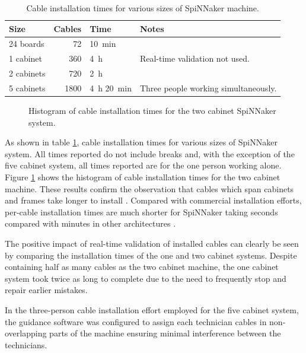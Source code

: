 			\begin{table}
				\center
				\begin{tabular}{lrll}
					\toprule
						Size & Cables & Time & Notes \\
					\midrule
						24 boards  & \num{72}   & \SI{10}{\minute} & \\
						1 cabinet  & \num{360}  & \SI{4}{\hour} &
							Real-time validation not used. \\
						2 cabinets & \num{720}  & \SI{2}{\hour} & \\
						5 cabinets & \num{1800} & \SI{4}{\hour} \SI{20}{\minute} &
							Three people working simultaneously. \\
					\bottomrule
				\end{tabular}
				
				\caption{Cable installation times for various sizes of SpiNNaker
				machine.}
				\label{tab:install-time}
			\end{table}
			
			\begin{figure}
				
				\caption{Histogram of cable installation times for the two cabinet
				SpiNNaker system.}
				\label{fig:install-histogram}
			\end{figure}
			
			As shown in table \ref{tab:install-time}, cable installation times for
			various sizes of SpiNNaker system. All times reported do not include
			breaks and, with the exception of the five cabinet system, all times
			reported are for the one person working alone.  Figure
			\ref{fig:install-histogram} shows the histogram of cable installation
			times for the two cabinet machine. These results confirm the observation
			that cables which span cabinets and frames take longer to install
			\cite{mudigonda11}.  Compared with commercial installation efforts,
			per-cable installation times are much shorter for SpiNNaker taking
			seconds compared with minutes in other architectures \cite{mudigonda11}.
			
			The positive impact of real-time validation of installed cables can
			clearly be seen by comparing the installation times of the one and two
			cabinet systems. Despite containing half as many cables as the two
			cabinet machine, the one cabinet system took twice as long to complete
			due to the need to frequently stop and repair earlier mistakes.
			
			In the three-person cable installation effort employed for the five
			cabinet system, the guidance software was configured to assign each
			technician cables in non-overlapping parts of the machine ensuring
			minimal interference between the technicians.
			
